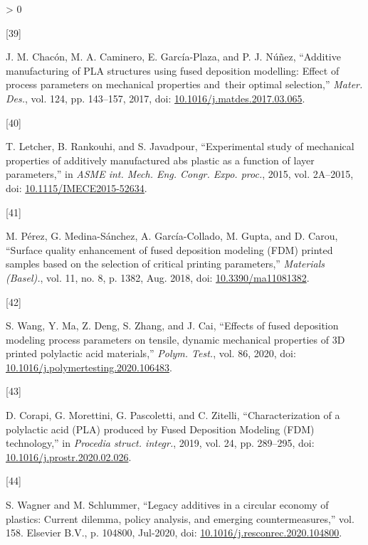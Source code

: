 \documentclass[conference,final,]{IEEEtran}
\newlength{\csllabelwidth}
\newlength{\cslhangindent}
\newenvironment{CSLReferences}[3] %
 {%
  \setlength{\parindent}{0pt}
  \ifodd #1 \everypar{\setlength{\hangindent}{\cslhangindent}}\ignorespaces\fi
  \ifnum #2 > 0
  \setlength{\parskip}{#2\baselineskip}
  \fi
 }%
 {}
\newcommand{\CSLLeftMargin}[1]{\parbox[t]{\csllabelwidth}{#1}}
\newcommand{\CSLRightInline}[1]{\parbox[t]{\linewidth - \csllabelwidth}{#1}}
\begin{document}
\begin{CSLReferences}{0}{0}
\leavevmode\hypertarget{ref-Chacon2017}{}%
\CSLLeftMargin{{[}39{]} }
\CSLRightInline{J. M. Chacón, M. A. Caminero, E. García-Plaza, and P. J.
Núñez, {``{Additive manufacturing of PLA structures using fused
deposition modelling: Effect of process parameters on mechanical
properties and~their optimal selection},''} \emph{Mater. Des.}, vol.
124, pp. 143--157, 2017, doi:
\href{https://doi.org/10.1016/j.matdes.2017.03.065}{10.1016/j.matdes.2017.03.065}.}

\leavevmode\hypertarget{ref-Letcher2015}{}%
\CSLLeftMargin{{[}40{]} }
\CSLRightInline{T. Letcher, B. Rankouhi, and S. Javadpour,
{``{Experimental study of mechanical properties of additively
manufactured abs plastic as a function of layer parameters},''} in
\emph{ASME int. Mech. Eng. Congr. Expo. proc.}, 2015, vol. 2A--2015,
doi:
\href{https://doi.org/10.1115/IMECE2015-52634}{10.1115/IMECE2015-52634}.}

\leavevmode\hypertarget{ref-Perez2018}{}%
\CSLLeftMargin{{[}41{]} }
\CSLRightInline{M. Pérez, G. Medina-Sánchez, A. García-Collado, M.
Gupta, and D. Carou, {``{Surface quality enhancement of fused deposition
modeling (FDM) printed samples based on the selection of critical
printing parameters},''} \emph{Materials (Basel).}, vol. 11, no. 8, p.
1382, Aug. 2018, doi:
\href{https://doi.org/10.3390/ma11081382}{10.3390/ma11081382}.}

\leavevmode\hypertarget{ref-Wang2020h}{}%
\CSLLeftMargin{{[}42{]} }
\CSLRightInline{S. Wang, Y. Ma, Z. Deng, S. Zhang, and J. Cai,
{``{Effects of fused deposition modeling process parameters on tensile,
dynamic mechanical properties of 3D printed polylactic acid
materials},''} \emph{Polym. Test.}, vol. 86, 2020, doi:
\href{https://doi.org/10.1016/j.polymertesting.2020.106483}{10.1016/j.polymertesting.2020.106483}.}

\leavevmode\hypertarget{ref-Corapi2019}{}%
\CSLLeftMargin{{[}43{]} }
\CSLRightInline{D. Corapi, G. Morettini, G. Pascoletti, and C. Zitelli,
{``{Characterization of a polylactic acid (PLA) produced by Fused
Deposition Modeling (FDM) technology},''} in \emph{Procedia struct.
integr.}, 2019, vol. 24, pp. 289--295, doi:
\href{https://doi.org/10.1016/j.prostr.2020.02.026}{10.1016/j.prostr.2020.02.026}.}

\leavevmode\hypertarget{ref-Wagner2020}{}%
\CSLLeftMargin{{[}44{]} }
\CSLRightInline{S. Wagner and M. Schlummer, {``{Legacy additives in a
circular economy of plastics: Current dilemma, policy analysis, and
emerging countermeasures},''} vol. 158. Elsevier B.V., p. 104800,
Jul-2020, doi:
\href{https://doi.org/10.1016/j.resconrec.2020.104800}{10.1016/j.resconrec.2020.104800}.}


\end{CSLReferences}
\end{document}
